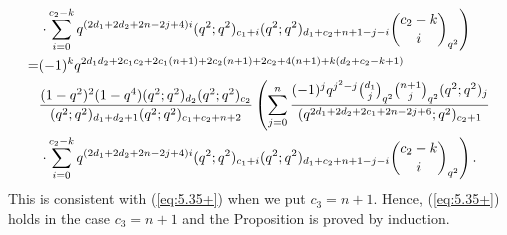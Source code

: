 \documentclass[table,a4paper,reqno]{amsart}
\numberwithin{equation}{section}
\theoremstyle{definition}
\begin{document}
\begin{align}
        &\left.\cdot\sum_{i=0}^{c_2-k}q^{(2d_1+2d_2+2n-2j+4)i}(q^2;q^2)_{c_1+i}(q^2;q^2)_{d_1+c_2+n+1-j-i}{c_2-k\choose i}_{q^2}\right)\notag\\
        =&(-1)^kq^{2d_1d_2+2c_1c_2+2c_1(n+1)+2c_2(n+1)+2c_2+4(n+1)+k(d_2+c_2-k+1)}\notag\\
        &\frac{(1-q^2)^2(1-q^4)(q^2;q^2)_{d_2}(q^2;q^2)_{c_2}}{(q^2;q^2)_{d_1+d_2+1}(q^2;q^2)_{c_1+c_2+n+2}}\left(\sum_{j=0}^{n}\frac{(-1)^{j}q^{j^2-j}{d_1\choose j}_{q^{2}}{n+1\choose j}_{q^2}(q^2;q^2)_{j}}{(q^{2d_1+2d_2+2c_1+2n-2j+6};q^2)_{c_2+1}}\right.\notag\\
        &\left.\cdot\sum_{i=0}^{c_2-k}q^{(2d_1+2d_2+2n-2j+4)i}(q^2;q^2)_{c_1+i}(q^2;q^2)_{d_1+c_2+n+1-j-i}{c_2-k\choose i}_{q^2}\right).\notag
\end{align}
This is consistent with (\ref{eq:5.35+}) when we put $c_3=n+1$. Hence, (\ref{eq:5.35+}) holds in the case $c_3=n+1$ and the Proposition is proved by induction.
\end{document}
